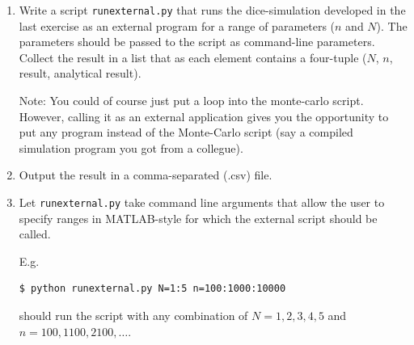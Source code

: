 \documentclass[smallheadings,12pt]{scrartcl}
\begin{document}
\begin{enumerate}
\item Write a script \texttt{runexternal.py} that runs the
  dice-simulation developed in the last exercise as an external
  program for a range of parameters ($n$ and $N$). The parameters
  should be passed to the script as command-line parameters. Collect
  the result in a list that as each element contains a four-tuple
  ($N$, $n$, result, analytical result).

  Note: You could of course just put a loop into the monte-carlo
  script. However, calling it as an external application gives you the
  opportunity to put any program instead of the Monte-Carlo script
  (say a compiled simulation program you got from a collegue).
\item Output the result in a comma-separated (.csv) file.
\item Let {\tt runexternal.py} take command line arguments that allow
  the user to specify ranges in MATLAB-style for which the external
  script should be called.

  E.g. 
\begin{verbatim}
$ python runexternal.py N=1:5 n=100:1000:10000 
\end{verbatim}
should run the script with any combination of $N=1,2,3,4,5$ and
$n=100,1100,2100,\ldots$. 
 
\end{enumerate}
\end{document}
